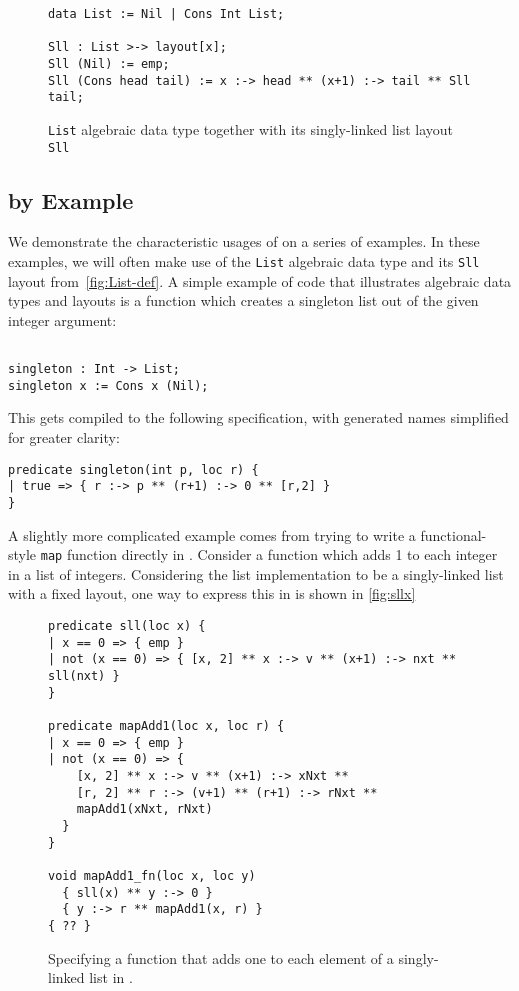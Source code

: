 \begin{figure}[t]
\begin{lstlisting}[language=Pika]
data List := Nil | Cons Int List;

Sll : List >-> layout[x];
Sll (Nil) := emp;
Sll (Cons head tail) := x :-> head ** (x+1) :-> tail ** Sll tail;
\end{lstlisting}
  \caption{\lstinline{List} algebraic data type together with its singly-linked list layout \lstinline{Sll}}
  \label{fig:List-def}
\end{figure}

\subsection{\Pika{} by Example}

We demonstrate the characteristic usages of \Pika{} on a series of
examples.
%
In these examples, we will often make use of the \verb|List| algebraic
data type and its \verb|Sll| layout from~\autoref{fig:List-def}. A
simple example of \Pika{} code that illustrates algebraic data types and
layouts is a function which creates a singleton list out of the given
integer argument:

\begin{lstlisting}[language=Pika]
%generate singleton [Int] Sll

singleton : Int -> List;
singleton x := Cons x (Nil);
\end{lstlisting}

\noindent
This gets compiled to the following \SuSLik{} specification, with generated names simplified for greater clarity:

\begin{lstlisting}[language=SynLang]
predicate singleton(int p, loc r) {
| true => { r :-> p ** (r+1) :-> 0 ** [r,2] }
}
\end{lstlisting}

\noindent
A slightly more complicated example comes from trying to write a
functional-style \verb|map| function directly in \SuSLik. Consider a
function which adds 1 to each integer in a list of integers.
Considering the list implementation to be a singly-linked list with a
fixed layout, one way to express this in \SuSLik{} is shown in \autoref{fig:sllx}

\begin{figure}[t]
  \begin{lstlisting}[language=SynLang]
predicate sll(loc x) {
| x == 0 => { emp }
| not (x == 0) => { [x, 2] ** x :-> v ** (x+1) :-> nxt ** sll(nxt) }
}

predicate mapAdd1(loc x, loc r) {
| x == 0 => { emp }
| not (x == 0) => {
    [x, 2] ** x :-> v ** (x+1) :-> xNxt **
    [r, 2] ** r :-> (v+1) ** (r+1) :-> rNxt **
    mapAdd1(xNxt, rNxt)
  }
}

void mapAdd1_fn(loc x, loc y)
  { sll(x) ** y :-> 0 }
  { y :-> r ** mapAdd1(x, r) }
{ ?? }
\end{lstlisting}
\caption{Specifying a function that adds one to each element of a
  singly-linked list in \SuSLik.}
\label{fig:sllx}
\end{figure}

